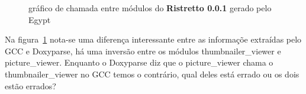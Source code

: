 \begin{figure}
\center
{}
\qquad
{}
\caption{gráfico de chamada entre módulos do {\bf Ristretto 0.0.1} gerado pelo Egypt}
\label{ristretto-0.0.1}
\end{figure}

Na figura~\ref{ristretto-0.0.1} nota-se uma diferença interessante entre as informaçõe extraídas pelo GCC e Doxyparse, há uma inversão entre os módulos thumbnailer\_viewer e picture\_viewer. Enquanto o Doxyparse diz que o picture\_viewer chama o thumbnailer\_viewer no GCC temos o contrário, qual deles está errado ou os dois estão errados?

